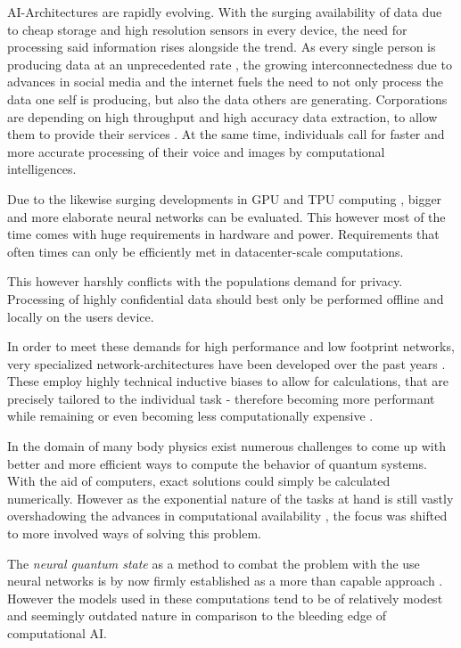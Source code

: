 AI-Architectures are rapidly evolving. With the surging availability of data due to cheap storage \cite*[]{costDataStorage} and high resolution sensors in every device, the need for processing said information rises alongside the trend.
As every single person is producing data at an unprecedented rate \cite*[]{dataCreatedRate}, the growing interconnectedness due to advances in social media and the internet fuels the need to not only process the data one self is producing, but also the data others are generating.
Corporations are depending on high throughput and high accuracy data extraction, to allow them to provide their services \cite*[]{marketsizeArtificialIntelligence}.
At the same time, individuals call for faster and more accurate processing of their voice and images by computational intelligences. 

Due to the likewise surging developments in GPU and TPU computing \cite*[]{gpuPerformanceOverTime}, bigger and more elaborate neural networks can be evaluated.
This however most of the time comes with huge requirements in hardware and power. 
Requirements that often times can only be efficiently met in datacenter-scale computations.

This however harshly conflicts with the populations demand for privacy. 
Processing of highly confidential data should best only be performed offline and locally on the users device.

In order to meet these demands for high performance and low footprint networks, very specialized network-architectures have been developed over the past years \cite[]{attentionIsAllYouNeed, metaformerPaper}. 
These employ highly technical inductive biases to allow for calculations, that are precisely tailored to the individual task - therefore becoming more performant while remaining or even becoming less computationally expensive \cite*[]{mobileNetPaper}.

In the domain of many body physics exist numerous challenges to come up with better and more efficient ways to compute the behavior of quantum systems.
With the aid of computers, exact solutions could \glqq simply\grqq{} be calculated numerically.
However as the exponential nature of the tasks at hand is still vastly overshadowing the advances in computational availability \cite*[]{quantumMonteCarloSimulationsOfSolids}, the focus was shifted to more involved ways of solving this problem.

The \emph{neural quantum state} as a method to combat the problem with the use neural networks is by now firmly established as a more than capable approach \cite*[]{quantumMBPwithneuralNetworks}. However the models used in these computations tend to be of relatively modest and seemingly \glqq outdated\grqq{} nature in comparison to the bleeding edge of computational AI.

